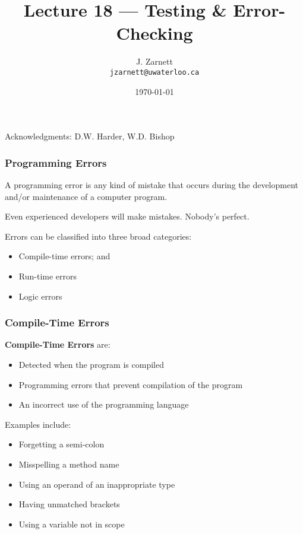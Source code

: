 

\title{Lecture 18 --- Testing \& Error-Checking }

\author{J. Zarnett\\
\texttt{jzarnett@uwaterloo.ca}}
\date{\today}



\begin{frame}
  \titlepage
  
  \begin{center}
  \small{Acknowledgments: D.W. Harder, W.D. Bishop}
  \end{center}
 \end{frame}

\begin{frame}
\frametitle{Programming Errors}

A programming error is any kind of mistake that occurs during the development and/or maintenance of a computer program.

Even experienced developers will make mistakes. Nobody's perfect.

Errors can be classified into three broad categories:
\begin{itemize}
	\item Compile-time errors; and
	\item Run-time errors
	\item Logic errors
\end{itemize}
\end{frame}

\begin{frame}
\frametitle{Compile-Time Errors}
\textbf{Compile-Time Errors} are:
\begin{itemize}
	\item Detected when the program is compiled
	\item Programming errors that prevent compilation of the program
	\item An incorrect use of the programming language
\end{itemize}
Examples include:
		\begin{itemize}
			\item Forgetting a semi-colon
			\item Misspelling a method name
			\item Using an operand of an inappropriate type
			\item Having unmatched brackets
			\item Using a variable not in scope
		\end{itemize}


\end{frame}

